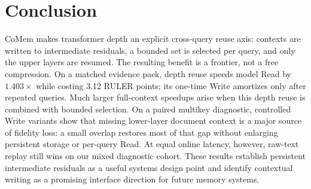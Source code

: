 \section{Conclusion}
\label{sec:conclusion}

CoMem makes transformer depth an explicit cross-query reuse axis: contexts are
written to intermediate residuals, a bounded set is selected per query, and only
the upper layers are resumed. The resulting benefit is a frontier, not a free
compression. On a matched evidence pack, depth reuse speeds model Read by
$1.403\times$ while costing 3.12 RULER points; its one-time Write amortizes only
after repeated queries. Much larger full-context speedups arise when this
depth reuse is combined with bounded selection. On a paired multikey
diagnostic, controlled Write variants show that missing lower-layer document
context is a major source of fidelity loss: a small overlap restores most of
that gap without enlarging persistent storage or per-query Read. At equal online latency, however, raw-text replay
still wins on our mixed diagnostic cohort. These results establish persistent
intermediate residuals as a useful systems design point and identify contextual
writing as a promising interface direction for future memory systems.
